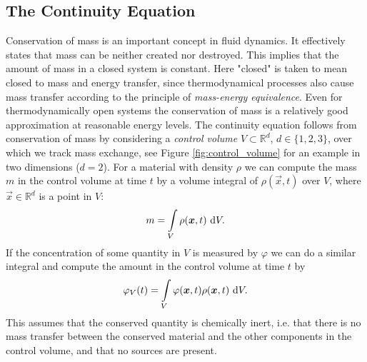 \subsection{The Continuity Equation}
\label{section:continuity_equation}
Conservation of mass is an important concept in fluid dynamics. It effectively states that mass can be neither created nor destroyed. This implies that the amount of mass in a closed system is constant. Here "closed" is taken to mean closed to mass and energy transfer, since thermodynamical processes also cause mass transfer according to the principle of \emph{mass-energy equivalence}.
Even for thermodynamically open systems the conservation of mass is a relatively good approximation at reasonable energy levels. The continuity equation follows from conservation of mass by considering a \emph{control volume} $V \subset \mathbb{R}^d$, $d \in \{1,2,3\}$, over which we track mass exchange, see Figure \ref{fig:control_volume} for an example in two dimensions ($d = 2$). For a material with density $\rho$ we can compute the mass $m$ in the control volume at time $t$ by a volume integral of $\rho(\vec{x},t)$ over $V$, where $\vec{x} \in \mathbb{R}^d$ is a point in $V$:
\begin{equation*}
m = \int \limits_{V} \rho(\boldsymbol{x},t) \ \text{d}V.
\end{equation*}
If the concentration of some quantity in $V$ is measured by $\varphi$ we can do a similar integral and compute the amount in the control volume at time $t$ by
\begin{equation*}
\varphi_V(t) = \int \limits_{V} \varphi(\boldsymbol{x},t)\rho(\boldsymbol{x},t) \ \text{d}V.
\end{equation*}
This assumes that the conserved quantity is chemically inert, i.e. that there is no mass transfer between the conserved material and the other components in the control volume, and that no sources are present.
